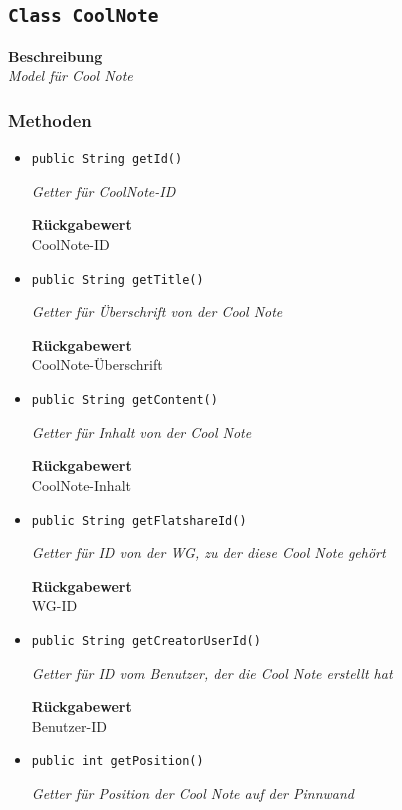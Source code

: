     \subsection{\texttt{Class CoolNote}}
    \textbf{Beschreibung} \\
    \textit{Model für Cool Note}
    \subsubsection{Methoden}
    \begin{itemize}
    	\item{\texttt{public String getId()}}
    	
    	\textit{Getter für CoolNote-ID}
    	
    	
    	
    	\textbf{Rückgabewert} \\
    	CoolNote-ID        \item{\texttt{public String getTitle()}}
    	
    	\textit{Getter für Überschrift von der Cool Note}
    	
    	
    	
    	\textbf{Rückgabewert} \\
    	CoolNote-Überschrift        \item{\texttt{public String getContent()}}
    	
    	\textit{Getter für Inhalt von der Cool Note}
    	
    	
    	
    	\textbf{Rückgabewert} \\
    	CoolNote-Inhalt        \item{\texttt{public String getFlatshareId()}}
    	
    	\textit{Getter für ID von der WG, zu der diese Cool Note gehört}
    	
    	
    	
    	\textbf{Rückgabewert} \\
    	WG-ID        \item{\texttt{public String getCreatorUserId()}}
    	
    	\textit{Getter für ID vom Benutzer, der die Cool Note erstellt hat}
    	
    	
    	
    	\textbf{Rückgabewert} \\
    	Benutzer-ID        \item{\texttt{public int getPosition()}}
    	
    	\textit{Getter für Position der Cool Note auf der Pinnwand}
    	

\end{itemize}
